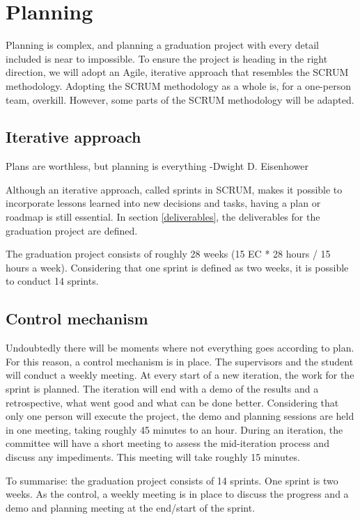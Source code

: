 \section{Planning} \label{planning}

Planning is complex, and planning a graduation project with every detail included is near to impossible. To ensure the project is heading in the right direction, we will adopt an Agile, iterative approach that resembles the SCRUM methodology. Adopting the SCRUM methodology as a whole is, for a one-person team, overkill. However, some parts of the SCRUM methodology will be adapted. 

\subsection{Iterative approach} \label{iterative-approach}
\begin{displayquote}
Plans are worthless, but planning is everything
-Dwight D. Eisenhower \cite{agile}
\end{displayquote}

Although an iterative approach, called sprints in SCRUM, makes it possible to incorporate lessons learned into new decisions and tasks, having a plan or roadmap is still essential. In section \ref{deliverables}, the deliverables for the graduation project are defined. 

The graduation project consists of roughly 28 weeks (15 EC * 28 hours / 15 hours a week). Considering that one sprint is defined as two weeks, it is possible to conduct 14 sprints. 

\subsection{Control mechanism} 
Undoubtedly there will be moments where not everything goes according to plan. For this reason, a control mechanism is in place. The supervisors and the student will conduct a weekly meeting. At every start of a new iteration, the work for the sprint is planned. The iteration will end with a demo of the results and a retrospective, what went good and what can be done better. Considering that only one person will execute the project, the demo and planning sessions are held in one meeting, taking roughly 45 minutes to an hour. During an iteration, the committee will have a short meeting to assess the mid-iteration process and discuss any impediments. This meeting will take roughly 15 minutes. 

To summarise: the graduation project consists of 14 sprints. One sprint is two weeks. As the control, a weekly meeting is in place to discuss the progress and a demo and planning meeting at the end/start of the sprint. 

